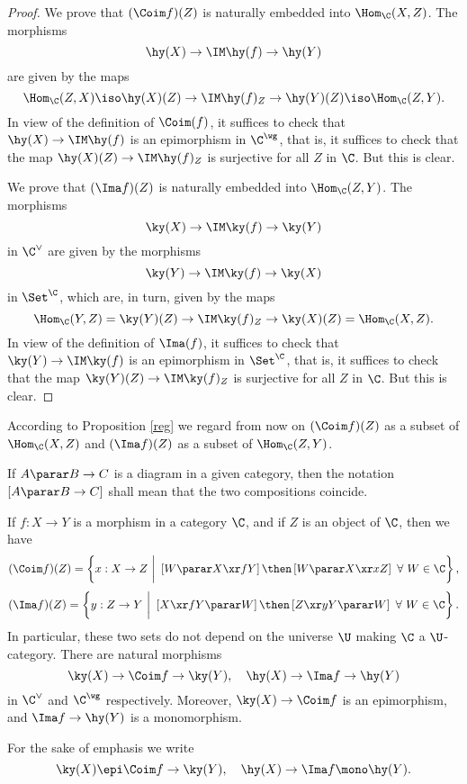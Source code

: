\documentclass[12pt]{article}
\theoremstyle{remark}
\theoremstyle{definition}
\begin{document}
\begin{proof}
We prove that $(\Coim f)(Z)$ is naturally embedded into $\Hom_\C(X,Z)$. The morphisms 
$$
\hy(X)\to\IM \hy(f)\to\hy(Y)
$$ 
are given by the maps 
$$
\Hom_\C(Z,X)\iso\hy(X)(Z)\to\IM\hy(f)_Z\to\hy(Y)(Z)\iso\Hom_\C(Z,Y).
$$ 
In view of the definition of $\Coim(f)$, it suffices to check that $\hy(X)\to\IM\hy(f)$ is an epimorphism in $\C^\wg$, that is, it suffices to check that the map $\hy(X)(Z)\to\IM\hy(f)_Z$ is surjective for all $Z$ in $\C$. But this is clear. 

We prove that $(\Ima f)(Z)$ is naturally embedded into $\Hom_\C(Z,Y)$. The morphisms 
$$
\ky(X)\to\IM\ky(f)\to\ky(Y)
$$ 
in $\C^\vee$ are given by the morphisms 
$$
\ky(Y)\to\IM\ky(f)\to\ky(X)
$$ 
in $\Set^\C$, which are, in turn, given by the maps 
$$
\Hom_\C(Y,Z)=\ky(Y)(Z)\to\IM\ky(f)_Z\to\ky(X)(Z)=\Hom_\C(X,Z).
$$ 
In view of the definition of $\Ima(f)$, it suffices to check that $\ky(Y)\to\IM\ky(f)$ is an epimorphism in $\Set^\C$, that is, it suffices to check that the map $\ky(Y)(Z)\to\IM\ky(f)_Z$ is surjective for all $Z$ in $\C$. But this is clear. 
\end{proof} 

According to Proposition \ref{reg} we regard from now on $(\Coim f)(Z)$ as a subset of $\Hom_\C(X,Z)$ and $(\Ima f)(Z)$ as a subset of $\Hom_\C(Z,Y)$.\bigskip

\begin{conv}
If $A\parar B\to C$ is a diagram in a given category, then the notation $[A\parar B\to C]$ shall mean that the two compositions coincide.
\end{conv}\bigskip

\begin{prop}
If $f:X\to Y$ is a morphism in a category $\C$, and if $Z$ is an object of $\C$, then we have 
$$
(\Coim f)(Z)=\left\{x:X\to Z\ \bigg|\ \left[W\parar X\xr fY\right]\then\left[W\parar X\xr xZ\right]\ \forall\ W\in\C\right\},
$$
$$
(\Ima f)(Z)=\left\{y:Z\to Y\ \bigg|\ \left[X\xr fY\parar W\right]\then\left[Z\xr yY\parar W\right]\ \forall\ W\in\C\right\}.
$$ 
In particular, these two sets do not depend on the universe $\U$ making $\C$ a $\U$\--category. There are natural morphisms 
$$
\ky(X)\to\Coim f\to\ky(Y),\quad\hy(X)\to\Ima f\to\hy(Y)
$$ 
in $\C^\vee$ and $\C^\wg$ respectively. Moreover, $\ky(X)\to\Coim f$ is an epimorphism, and $\Ima f\to\hy(Y)$ is a monomorphism. 
\end{prop} 

For the sake of emphasis we write
$$
\ky(X)\epi\Coim f\to\ky(Y),\quad\hy(X)\to\Ima f\mono\hy(Y).
$$ 
\end{document}
